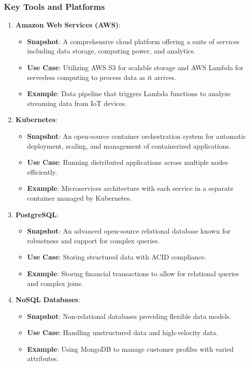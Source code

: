 \documentclass[aspectratio=169]{beamer}
\begin{document}
\begin{frame}
    \frametitle{Key Tools and Platforms}
    \begin{enumerate}
        \item \textbf{Amazon Web Services (AWS)}:
            \begin{itemize}
                \item \textbf{Snapshot}: A comprehensive cloud platform offering a suite of services including data storage, computing power, and analytics.
                \item \textbf{Use Case}: Utilizing AWS S3 for scalable storage and AWS Lambda for serverless computing to process data as it arrives.
                \item \textbf{Example}: Data pipeline that triggers Lambda functions to analyze streaming data from IoT devices.
            \end{itemize}
        
        \item \textbf{Kubernetes}:
            \begin{itemize}
                \item \textbf{Snapshot}: An open-source container orchestration system for automatic deployment, scaling, and management of containerized applications.
                \item \textbf{Use Case}: Running distributed applications across multiple nodes efficiently.
                \item \textbf{Example}: Microservices architecture with each service in a separate container managed by Kubernetes.
            \end{itemize}

        \item \textbf{PostgreSQL}:
            \begin{itemize}
                \item \textbf{Snapshot}: An advanced open-source relational database known for robustness and support for complex queries.
                \item \textbf{Use Case}: Storing structured data with ACID compliance.
                \item \textbf{Example}: Storing financial transactions to allow for relational queries and complex joins.
            \end{itemize}
        
        \item \textbf{NoSQL Databases}:
            \begin{itemize}
                \item \textbf{Snapshot}: Non-relational databases providing flexible data models.
                \item \textbf{Use Case}: Handling unstructured data and high-velocity data.
                \item \textbf{Example}: Using MongoDB to manage customer profiles with varied attributes.
            \end{itemize}
    \end{enumerate}
\end{frame}
\end{document}
